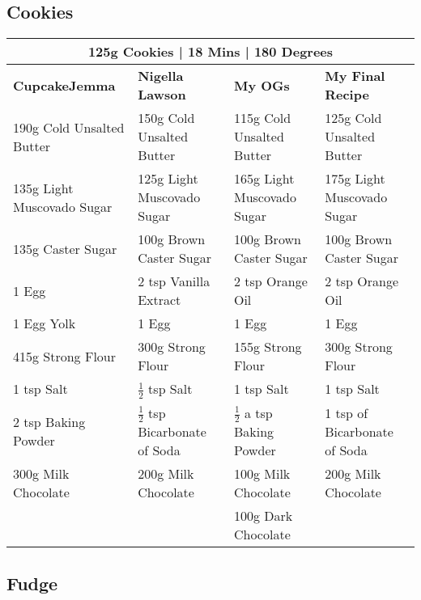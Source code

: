 \documentclass[11pt, english]{article}
\begin{document}
\newpage

	\subsection{Cookies}

	\begin{table}[h]
	        \scriptsize
	\begin{center}
	\begin{tabular}{p{4cm}p{4cm}p{4cm}p{4cm}}
	        \multicolumn{4}{c}{125g Cookies | 18 Mins | 180 Degrees}\\
	        \hline
	        \textbf{CupcakeJemma} & \textbf{Nigella Lawson} & \textbf{My OGs} & \textbf{My Final Recipe}\\
	        \hline
	        190g Cold Unsalted Butter & 150g Cold Unsalted Butter & 115g Cold Unsalted Butter & 125g Cold Unsalted Butter\\
	        135g Light Muscovado Sugar & 125g Light Muscovado Sugar & 165g Light Muscovado Sugar & 175g Light Muscovado Sugar\\
	        135g Caster Sugar & 100g Brown Caster Sugar & 100g Brown Caster Sugar & 100g Brown Caster Sugar\\
	        1 Egg & 2 tsp Vanilla Extract & 2 tsp Orange Oil & 2 tsp Orange Oil\\
	        1 Egg Yolk & 1 Egg & 1 Egg & 1 Egg\\
	        415g Strong Flour & 300g Strong Flour & 155g Strong Flour & 300g Strong Flour\\
	        1 tsp Salt & $\frac{1}{2}$ tsp Salt & 1 tsp Salt & 1 tsp Salt\\
	        2 tsp Baking Powder & $\frac{1}{2}$ tsp Bicarbonate of Soda & $\frac{1}{2}$ a tsp Baking Powder & 1 tsp of Bicarbonate of Soda\\
	        300g Milk Chocolate & 200g Milk Chocolate & 100g Milk Chocolate & 200g Milk Chocolate\\
	        & & 100g Dark Chocolate & \\
	        \hline
	\end{tabular}
	\end{center}
	\end{table}

\newpage

	\subsection{Fudge}
\end{document}
